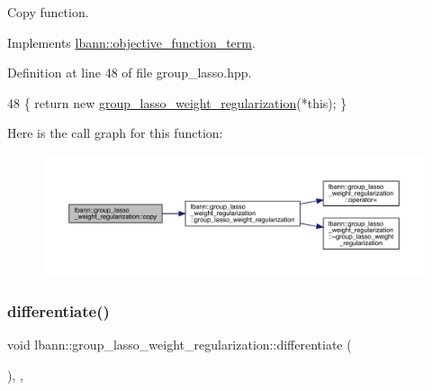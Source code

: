 Copy function. 

Implements \hyperlink{classlbann_1_1objective__function__term_ae98a4ec173a602ad55d1df20dadd4cb9}{lbann\+::objective\+\_\+function\+\_\+term}.



Definition at line 48 of file group\+\_\+lasso.\+hpp.


\begin{DoxyCode}
48 \{ \textcolor{keywordflow}{return} \textcolor{keyword}{new} \hyperlink{classlbann_1_1group__lasso__weight__regularization_a6ffca49b19d4adbff300a229ef85ac3b}{group\_lasso\_weight\_regularization}(*\textcolor{keyword}{this}); \}
\end{DoxyCode}
Here is the call graph for this function\+:\nopagebreak
\begin{figure}[H]
\begin{center}
\leavevmode
\includegraphics[width=350pt]{classlbann_1_1group__lasso__weight__regularization_a279b67ef561918425e78cb9b2fa9bb88_cgraph}
\end{center}
\end{figure}
\mbox{\label{classlbann_1_1group__lasso__weight__regularization_a9d5843ebd2c3a1f77013c7b2bebb7a69}} 
\subsubsection{\texorpdfstring{differentiate()}{differentiate()}}
{\footnotesize\ttfamily void lbann\+::group\+\_\+lasso\+\_\+weight\+\_\+regularization\+::differentiate (\begin{DoxyParamCaption}{ }\end{DoxyParamCaption})\hspace{0.3cm}{\ttfamily [inline]}, {\ttfamily [override]}, {\ttfamily [virtual]}}

